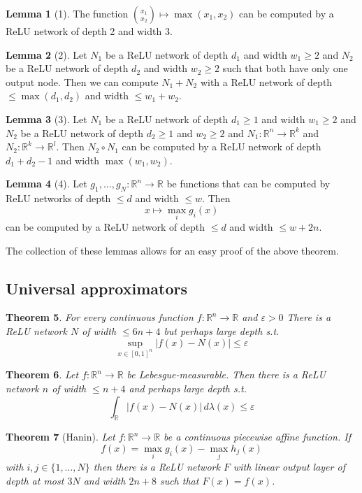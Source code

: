 \documentclass[a4paper, 12pt]{article}
\theoremstyle{plain}
\newtheorem{theorem}{Theorem}[subsection] %
\theoremstyle{definition}
\theoremstyle{lemma}
\newtheorem{lemma}[theorem]{Lemma}
\theoremstyle{remark}
\theoremstyle{example}
\begin{document}
	\begin{lemma}[1]
		The function $\binom{x_1}{x_2} \mapsto \max(x_1,x_2)$ can be computed by a ReLU network of depth 2 and width 3. 
	\end{lemma}
	\begin{lemma}[2]
		Let $N_1$ be a ReLU network of depth $d_1$ and width $w_1\geq 2$ and $N_2$ be a ReLU network of depth $d_2$ and width $w_2 \geq 2$ such that both have only one output node. Then we can compute $N_1+N_2$ with a ReLU network of depth $\leq \max(d_1,d_2)$ and width $\leq w_1+w_2$.
	\end{lemma}
	\begin{lemma}[3]
		Let $N_1$ be a ReLU network of depth $d_1 \geq 1$ and width $w_1 \geq 2$ and $N_2$ be a ReLU network of depth $d_2 \geq 1$ and $w_2 \geq 2$ and $N_1: \mathbb{R}^n \to \mathbb{R}^k$ and $N_2: \mathbb{R}^k \to \mathbb{R}^l$. Then $N_2 \circ N_1$ can be computed by a ReLU network of depth $d_1+d_2-1$ and width $\max(w_1,w_2)$.
	\end{lemma}
	\begin{lemma}[4]
		Let $g_1,...,g_N: \mathbb{R}^n \to \mathbb{R}$ be functions that can be computed by ReLU networks of depth $\leq d$ and width $\leq w$. Then \[x \mapsto \max_i g_i(x)\] can be computed by a ReLU network of depth $\leq d$ and width $\leq w+2n$.
	\end{lemma}
	The collection of these lemmas allows for an easy proof of the above theorem.
	\subsection{Universal approximators}
	\begin{theorem}
		For every continuous function $f:\mathbb{R}^n \to \mathbb{R}$ and $\varepsilon > 0$ There is a ReLU network $N$ of width $\leq 6n+4$ but perhaps large depth s.t. \[\sup_{x\in [0,1]^n} \left|f(x)-N(x)\right| \leq \varepsilon\]
	\end{theorem}
	\begin{theorem}
		Let $f: \mathbb{R}^n \to \mathbb{R}$ be Lebesgue-measurable. Then there is a ReLU network $n$ of width $\leq n+4$ and perhaps large depth s.t. \[\int_{\mathbb{R}} \left|f(x) - N(x)\right|\, d\lambda(x) \leq \varepsilon\]
	\end{theorem}
	\begin{theorem}[Hanin]
		Let $f: \mathbb{R}^n \to \mathbb{R}$ be a continuous piecewise affine function. If \[f(x) = \max_i g_i(x) - \max_j h_j(x)\] with $i,j \in \{1,...,N\}$ then there is a ReLU network $F$ with linear output layer of depth at most $3N$ and width $2n+8$ such that $F(x) = f(x)$.
	\end{theorem}
\end{document}
